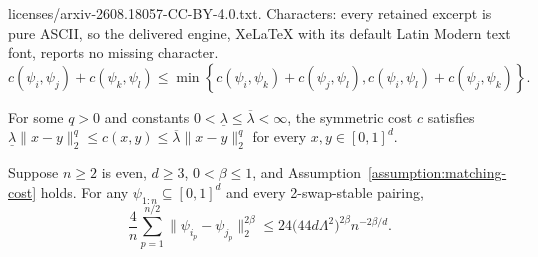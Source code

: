 \documentclass[10pt,a4paper]{amsart}
\begin{document}
licenses/arxiv-2608.18057-CC-BY-4.0.txt. Characters: every retained excerpt is pure ASCII, so the delivered engine, XeLaTeX with its default Latin Modern text font, reports no missing character.
\begin{equation}\label{equation:swap-stability}
c(\psi_i,\psi_j)+c(\psi_k,\psi_l) \leq \min\left\{ c(\psi_i,\psi_k)+c(\psi_j,\psi_l), c(\psi_i,\psi_l)+c(\psi_j,\psi_k) \right\}.
\end{equation}

\begin{assumption}\label{assumption:matching-cost}
For some $q>0$ and constants $0<\underline\lambda\leq\overline\lambda<\infty$, the symmetric cost $c$ satisfies $\underline\lambda\|x-y\|_2^q\leq c(x,y)\leq\overline\lambda\|x-y\|_2^q$ for every $x,y\in[0,1]^d$.
\end{assumption}

\begin{lem}\label{lemma:proof-stable-pair-distance}
Suppose $n\geq2$ is even, $d\geq3$, $0<\beta\leq1$, and Assumption~\ref{assumption:matching-cost} holds.
For any $\psi_{1:n} \subseteq [0,1]^d$ and every 2-swap-stable pairing,
\begin{equation}
\frac{4}{n} \sum_{p=1}^{n/2} \|\psi_{i_p}-\psi_{j_p}\|_2^{2\beta} \leq 24\bigl(44d\Lambda^2\bigr)^{2\beta} n^{-2\beta/d}.
\end{equation}
\end{lem}
\end{document}
